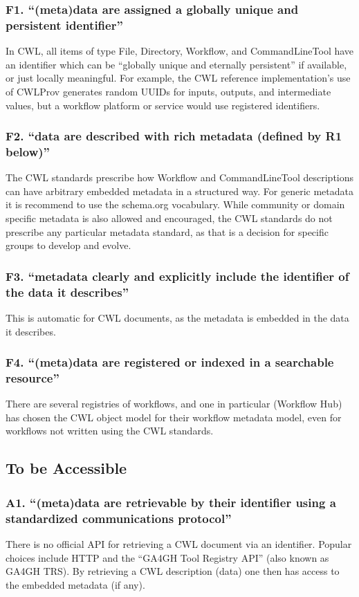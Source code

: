 \subsubsection{F1. “(meta)data are assigned a globally unique and persistent identifier”}
In CWL, all items of type File, Directory, Workflow, and CommandLineTool have an identifier which can be “globally unique and eternally persistent” if available, or just locally meaningful. For example, the CWL reference implementation’s use of CWLProv generates random UUIDs for inputs, outputs, and intermediate values, but a workflow platform or service would use registered identifiers.
\subsubsection{F2. “data are described with rich metadata (defined by R1 below)”}
The CWL standards prescribe how Workflow and CommandLineTool descriptions can have arbitrary embedded metadata in a structured way. For generic metadata it is recommend to use the schema.org vocabulary. While community or domain specific metadata is also allowed and encouraged, the CWL standards do not prescribe any particular metadata standard, as that is a decision for specific groups to develop and evolve.
\subsubsection{F3. “metadata clearly and explicitly include the identifier of the data it describes”}
This is automatic for CWL documents, as the metadata is embedded in the data it describes.
\subsubsection{F4. “(meta)data are registered or indexed in a searchable resource”}
There are several registries of workflows, and one in particular (Workflow Hub) has chosen the CWL object model for their workflow metadata model, even for workflows not written using the CWL standards.
\subsection{To be Accessible}
\subsubsection{A1. “(meta)data are retrievable by their identifier using a standardized communications protocol”}
There is no official API for retrieving a CWL document via an identifier. Popular choices include HTTP and the “GA4GH Tool Registry API” (also known as GA4GH TRS). By retrieving a CWL description (data) one then has access to the embedded metadata (if any).

